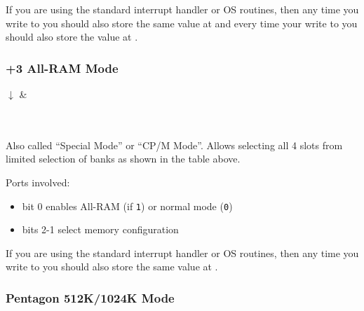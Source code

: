 If you are using the standard interrupt handler or OS routines, then any time you write to  you should also store the same value at  and every time your write to  you should also store the value at .


\subsubsection{+3 All-RAM Mode}

\begin{PagingTableLegacy}
	\PagingTableLegacyItem{}{$\uparrow$}{$\uparrow$}{$\uparrow$}{$\uparrow$}
	$\downarrow$ & \\
	 \\
	 \\
\end{PagingTableLegacy}

Also called ``Special Mode'' or ``CP/M Mode''. Allows selecting all 4 slots from limited selection of banks as shown in the table above.

Ports involved:

\begin{itemize}[topsep=0pt,itemsep=0pt]
	\item {} bit 0 enables All-RAM (if {\tt 1}) or normal mode ({\tt 0})
	\item {} bits 2-1 select memory configuration
\end{itemize}

If you are using the standard interrupt handler or OS routines, then any time you write to  you should also store the same value at .


\subsubsection{Pentagon 512K/1024K Mode}

